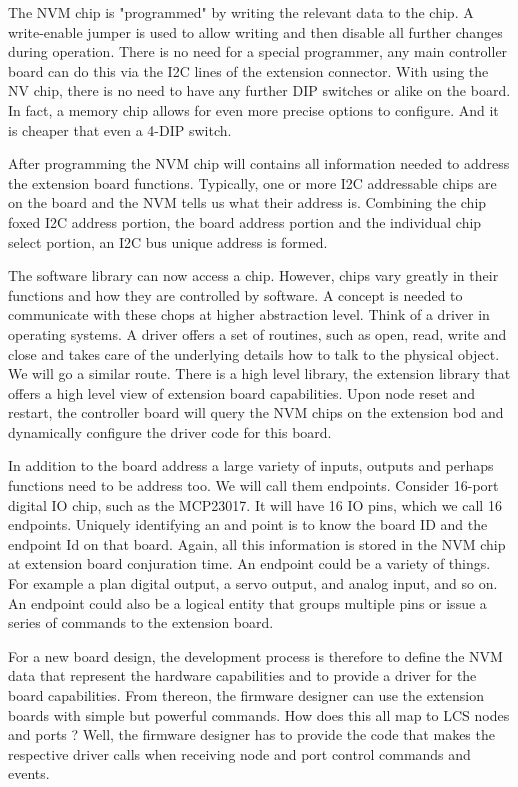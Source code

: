 The NVM chip is "programmed" by writing the relevant data to the chip. A write-enable jumper is used to allow writing and then disable all further changes during operation. There is no need for a special programmer, any main controller board can do this via the I2C lines of the extension connector. With using the NV chip, there is no need to have any further DIP switches or alike on the board. In fact, a memory chip allows for even more precise options to configure. And it is cheaper that even a 4-DIP switch.

After programming the NVM chip will contains all information needed to address the extension board functions. Typically, one or more I2C addressable chips are on the board and the NVM tells us what their address is. Combining the chip foxed I2C address portion, the board address portion and the individual chip select portion, an I2C bus unique address is formed. 

The software library can now access a chip. However, chips vary greatly in their functions and how they are controlled by software. A concept is needed to communicate with these chops at  higher abstraction level. Think of a driver in operating systems. A driver offers a set of routines, such as open, read, write and close and takes care of the underlying details how to talk to the physical object. We will go a similar route. There is a high level library, the extension library that offers a high level view of extension board capabilities. Upon node reset and restart, the controller board will query the NVM chips on the extension bod and dynamically configure the driver code for this board.

In addition to the board address a large variety of inputs, outputs and perhaps functions need to be address too. We will call them endpoints. Consider  16-port digital IO chip, such as the MCP23017. It will have 16 IO pins, which we call 16 endpoints. Uniquely identifying an and point is to know the board ID and the endpoint Id on that board. Again, all this information is stored in the NVM  chip at extension board conjuration time. An endpoint could be a variety of things. For example a plan digital output, a servo output, and analog input, and so on. An endpoint could also be a logical entity that groups multiple pins or issue a series of commands to the extension board.

For a new board design, the development process is therefore to define the NVM data that represent the hardware capabilities  and to provide a driver for the board capabilities. From thereon, the firmware designer can use the extension boards with simple but powerful commands. How does this all map to LCS nodes and ports ? Well, the firmware designer has to provide the code that makes the respective driver calls when receiving node and port control commands and events.

